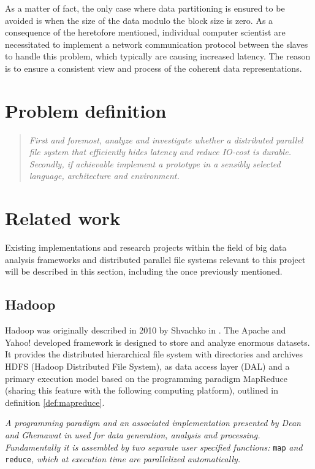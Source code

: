 As a matter of fact, the only case where data partitioning is ensured to be avoided is when the size of the data modulo the block size is zero. As a consequence of the heretofore mentioned, individual computer scientist are necessitated to implement a network communication protocol between the slaves to handle this problem, which typically are causing increased latency. The reason is to ensure a consistent view and process of the coherent data representations.

\section{Problem definition} \label{sec:problem}
\begin{quotation}
\hspace*{-7mm}
\textit{First and foremost, analyze and investigate whether a distributed parallel file system that efficiently hides latency and reduce IO-cost is durable. Secondly, if achievable implement a prototype in a sensibly selected language, architecture and environment.} \newline
\end{quotation}

\section{Related work} \label{sec:related}
Existing implementations and research projects within the field of big data analysis frameworks and distributed parallel file systems relevant to this project will be described in this section, including the once previously mentioned.

\subsection*{Hadoop}
Hadoop was originally described in 2010 by Shvachko \etal in \cite{Shvachko:2010:HDF:1913798.1914427}. The Apache and Yahoo! developed framework is designed to store and analyze enormous datasets. It provides the distributed hierarchical file system with directories and archives HDFS (Hadoop Distributed File System), as data access layer (DAL) and a primary execution model based on the programming paradigm MapReduce (sharing this feature with the following computing platform), outlined in definition \ref{def:mapreduce}.
\vspace*{5mm}

\begin{definition}[MapReduce] \label{def:mapreduce}
\textit{A programming paradigm and an associated implementation presented by Dean and Ghemawat in} \cite{Dean:2008:MSD:1327452.1327492} \textit{used for data generation, analysis and processing. Fundamentally it is assembled by two separate user specified functions:} \texttt{map} \textit{and} \texttt{reduce}\textit{, which at execution time are parallelized automatically.}
\end{definition}

